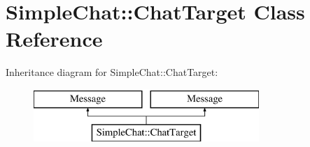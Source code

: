 \hypertarget{classSimpleChat_1_1ChatTarget}{\section{Simple\-Chat\-:\-:Chat\-Target Class Reference}
\label{classSimpleChat_1_1ChatTarget}
}
Inheritance diagram for Simple\-Chat\-:\-:Chat\-Target\-:\begin{figure}[H]
\begin{center}
\leavevmode
\includegraphics[height=2.000000cm]{classSimpleChat_1_1ChatTarget}
\end{center}
\end{figure}
